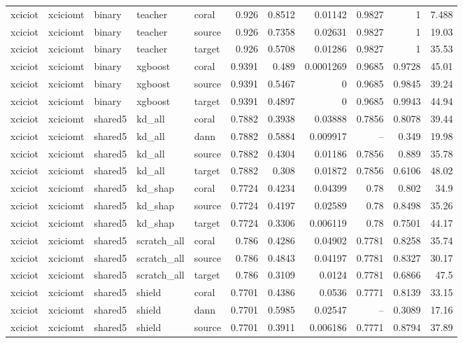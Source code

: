 \begin{table}
\begin{tabular}{lllllrrrrrr}
xciciot & xciciomt & binary & teacher & coral & 0.926 & 0.8512 & 0.01142 & 0.9827 & 1 & 7.488 \\
xciciot & xciciomt & binary & teacher & source & 0.926 & 0.7358 & 0.02631 & 0.9827 & 1 & 19.03 \\
xciciot & xciciomt & binary & teacher & target & 0.926 & 0.5708 & 0.01286 & 0.9827 & 1 & 35.53 \\
xciciot & xciciomt & binary & xgboost & coral & 0.9391 & 0.489 & 0.0001269 & 0.9685 & 0.9728 & 45.01 \\
xciciot & xciciomt & binary & xgboost & source & 0.9391 & 0.5467 & 0 & 0.9685 & 0.9845 & 39.24 \\
xciciot & xciciomt & binary & xgboost & target & 0.9391 & 0.4897 & 0 & 0.9685 & 0.9943 & 44.94 \\
xciciot & xciciomt & shared5 & kd_all & coral & 0.7882 & 0.3938 & 0.03888 & 0.7856 & 0.8078 & 39.44 \\
xciciot & xciciomt & shared5 & kd_all & dann & 0.7882 & 0.5884 & 0.009917 & -- & 0.349 & 19.98 \\
xciciot & xciciomt & shared5 & kd_all & source & 0.7882 & 0.4304 & 0.01186 & 0.7856 & 0.889 & 35.78 \\
xciciot & xciciomt & shared5 & kd_all & target & 0.7882 & 0.308 & 0.01872 & 0.7856 & 0.6106 & 48.02 \\
xciciot & xciciomt & shared5 & kd_shap & coral & 0.7724 & 0.4234 & 0.04399 & 0.78 & 0.802 & 34.9 \\
xciciot & xciciomt & shared5 & kd_shap & source & 0.7724 & 0.4197 & 0.02589 & 0.78 & 0.8498 & 35.26 \\
xciciot & xciciomt & shared5 & kd_shap & target & 0.7724 & 0.3306 & 0.006119 & 0.78 & 0.7501 & 44.17 \\
xciciot & xciciomt & shared5 & scratch_all & coral & 0.786 & 0.4286 & 0.04902 & 0.7781 & 0.8258 & 35.74 \\
xciciot & xciciomt & shared5 & scratch_all & source & 0.786 & 0.4843 & 0.04197 & 0.7781 & 0.8327 & 30.17 \\
xciciot & xciciomt & shared5 & scratch_all & target & 0.786 & 0.3109 & 0.0124 & 0.7781 & 0.6866 & 47.5 \\
xciciot & xciciomt & shared5 & shield & coral & 0.7701 & 0.4386 & 0.0536 & 0.7771 & 0.8139 & 33.15 \\
xciciot & xciciomt & shared5 & shield & dann & 0.7701 & 0.5985 & 0.02547 & -- & 0.3089 & 17.16 \\
xciciot & xciciomt & shared5 & shield & source & 0.7701 & 0.3911 & 0.006186 & 0.7771 & 0.8794 & 37.89 \\

\end{tabular}
\end{table}
